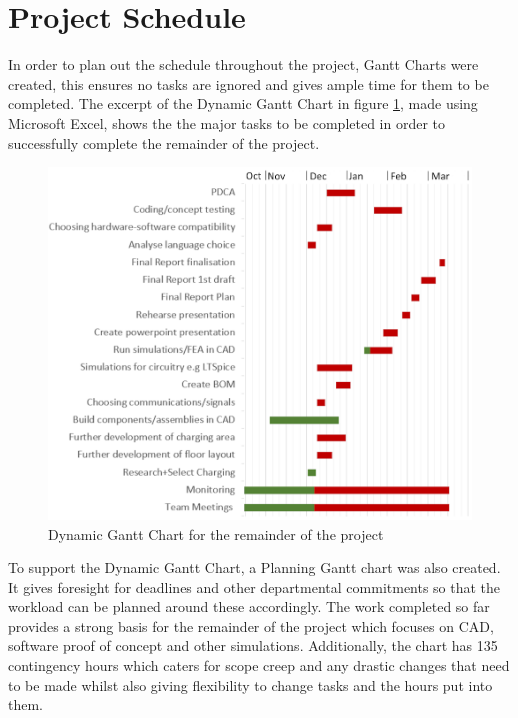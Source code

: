 \documentclass[12pt]{article}
\begin{document}
 \FloatBarrier
 
\section{Project Schedule}

In order to plan out the schedule throughout the project, Gantt Charts were created, this ensures no tasks are ignored and gives ample time for them to be completed. The excerpt of the Dynamic Gantt Chart in  figure \ref{fig:x}, made using Microsoft Excel, shows the the major tasks to be completed in order to successfully complete the remainder of the project. 

\begin{figure}[H]
    \centering
        \includegraphics[width=0.8\linewidth]{GANTT EDITED BY LOUIS.png} %
        \caption{Dynamic Gantt Chart for the remainder of the project}
        \label{fig:x}

\end{figure}
To support the Dynamic Gantt Chart, a Planning Gantt chart was also created. It gives foresight for deadlines and other departmental commitments so that the workload can be planned around these accordingly. The work completed so far provides a strong basis for the remainder of the project which focuses on CAD, software proof of concept and other simulations. Additionally, the  chart has 135 contingency hours which caters for scope creep and any drastic changes that need to be made whilst also giving flexibility to change tasks and the hours put into them. 
\end{document}
